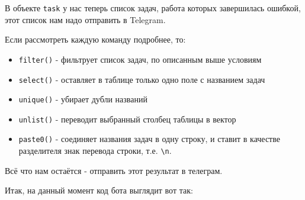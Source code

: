 \documentclass[
]{book}
\newenvironment{Shaded}{\begin{snugshade}}{\end{snugshade}}
\newcommand{\AttributeTok}[1]{\textcolor[rgb]{0.13,0.29,0.53}{#1}}
\newcommand{\FunctionTok}[1]{\textcolor[rgb]{0.13,0.29,0.53}{\textbf{#1}}}
\newcommand{\NormalTok}[1]{#1}
\newcommand{\SpecialCharTok}[1]{\textcolor[rgb]{0.81,0.36,0.00}{\textbf{#1}}}
\newcommand{\StringTok}[1]{\textcolor[rgb]{0.31,0.60,0.02}{#1}}
\providecommand{\tightlist}{%
  \setlength{\itemsep}{0pt}\setlength{\parskip}{0pt}}
\begin{document}
В объекте \texttt{task} у нас теперь список задач, работа которых завершилась ошибкой, этот список нам надо отправить в Telegram.

Если рассмотреть каждую команду подробнее, то:

\begin{itemize}
\tightlist
\item
  \texttt{filter()} - фильтрует список задач, по описанным выше условиям
\item
  \texttt{select()} - оставляет в таблице только одно поле с названием задач
\item
  \texttt{unique()} - убирает дубли названий
\item
  \texttt{unlist()} - переводит выбранный столбец таблицы в вектор
\item
  \texttt{paste0()} - соединяет названия задач в одну строку, и ставит в качестве разделителя знак перевода строки, т.е. \texttt{\textbackslash{}n}.
\end{itemize}

Всё что нам остаётся - отправить этот результат в телеграм.

\begin{Shaded}
\end{Shaded}

Итак, на данный момент код бота выглядит вот так:
\end{document}
